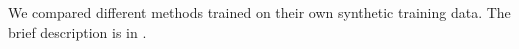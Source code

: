 We compared different methods trained on their own synthetic training data.
The brief description is in .
